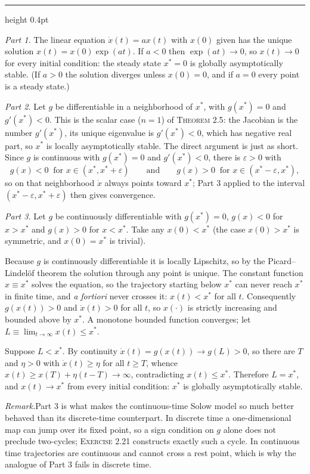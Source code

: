 \documentclass[11pt,letterpaper,reqno]{amsart}
\makeatletter
\newcommand{\dt}[1]{\dot{#1}}
\newcommand{\as@head}[3]{%
  \par\addvspace{1.6ex}\penalty-200\relax
  \phantomsection
  \addcontentsline{toc}{subsection}{#1 #2\texorpdfstring{\ifx\relax#3\relax\else\quad #3\fi}{}}%
  {\color{RuleGrey}\hrule height 0.4pt}%
  \nobreak\vspace{0.8ex}\nobreak
  \noindent{\bfseries #1 #2}%
  \ifx\relax#3\relax\else\quad{\bfseries\itshape #3}\fi
  \par\nobreak\vspace{0.4ex}\nobreak
  \as@beginstatement
}
\newcommand{\as@beginstatement}{\begingroup\itshape\ignorespaces}
\newenvironment{aex}[2]{\as@head{Exercise}{#1}{#2}}{\par\addvspace{1.2ex}}
\newcommand{\rmk}[1]{%
  \par\vspace{0.6ex}%
  {\small\noindent\textit{Remark.}\hspace{0.5em}#1\par}%
  \vspace{0.4ex}%
}
\newcommand{\bk}[1]{\textup{\textsc{#1}}}
\renewcommand{\as@beginstatement}{\ignorespaces}
\makeatother
\begin{document}
\begin{aex}{2.10}{}
\emph{Part 1.}  The linear equation $\dt x(t)=ax(t)$ with $x(0)$ given has the unique solution
$x(t)=x(0)\exp(at)$.  If $a<0$ then $\exp(at)\to0$, so $x(t)\to0$ for every initial condition: the steady
state $x^*=0$ is globally asymptotically stable.  (If $a>0$ the solution diverges unless $x(0)=0$, and if
$a=0$ every point is a steady state.)

\emph{Part 2.}  Let $g$ be differentiable in a neighborhood of $x^*$, with $g(x^*)=0$ and $g'(x^*)<0$.  This
is the scalar case ($n=1$) of \bk{Theorem 2.5}: the Jacobian is the number $g'(x^*)$, its unique eigenvalue
is $g'(x^*)<0$, which has negative real part, so $x^*$ is locally asymptotically stable.  The direct
argument is just as short.  Since $g$ is continuous with $g(x^*)=0$ and $g'(x^*)<0$, there is
$\varepsilon>0$ with
\[
g(x)<0\ \text{ for }x\in(x^*,x^*+\varepsilon)
\qquad\text{and}\qquad
g(x)>0\ \text{ for }x\in(x^*-\varepsilon,x^*),
\]
so on that neighborhood $\dt x$ always points toward $x^*$; Part 3 applied to the interval
$(x^*-\varepsilon,x^*+\varepsilon)$ then gives convergence.

\emph{Part 3.}  Let $g$ be continuously differentiable with $g(x^*)=0$, $g(x)<0$ for $x>x^*$ and $g(x)>0$
for $x<x^*$.  Take any $x(0)<x^*$ (the case $x(0)>x^*$ is symmetric, and $x(0)=x^*$ is trivial).

Because $g$ is continuously differentiable it is locally Lipschitz, so by the Picard--Lindel\"of theorem
the solution through any point is unique.  The constant function $x\equiv x^*$ solves the equation, so the
trajectory starting below $x^*$ can never reach $x^*$ in finite time, and \emph{a fortiori} never crosses
it: $x(t)<x^*$ for all $t$.  Consequently $g(x(t))>0$ and $\dt x(t)>0$ for all $t$, so $x(\cdot)$ is
strictly increasing and bounded above by $x^*$.  A monotone bounded function converges; let
$L\equiv\lim_{t\to\infty}x(t)\le x^*$.

Suppose $L<x^*$.  By continuity $\dt x(t)=g(x(t))\to g(L)>0$, so there are $T$ and $\eta>0$ with
$\dt x(t)\ge\eta$ for all $t\ge T$, whence $x(t)\ge x(T)+\eta(t-T)\to\infty$, contradicting $x(t)\le x^*$.
Therefore $L=x^*$, and $x(t)\to x^*$ from every initial condition: $x^*$ is globally asymptotically stable.

\rmk{Part 3 is what makes the continuous-time Solow model so much better behaved than its discrete-time
counterpart.  In discrete time a one-dimensional map can jump over its fixed point, so a sign condition on
$g$ alone does not preclude two-cycles; \bk{Exercise 2.21} constructs exactly such a cycle.  In continuous
time trajectories are continuous and cannot cross a rest point, which is why the analogue of Part 3 fails
in discrete time.}
\end{aex}
\end{document}
